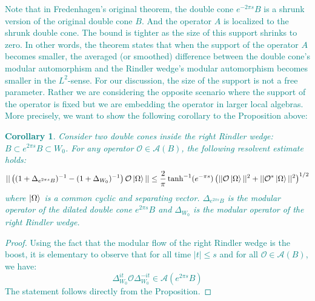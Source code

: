 \documentclass[a4paper,11pt]{article}
\newtheorem{corollary}[theorem]{Corollary}
\theoremstyle{definition}
\newcommand{\lb}{\left(}
\newcommand{\rb}{\right)}
\newcommand{\YC}[1]{\textcolor{teal}{#1}}
\begin{document}
\YC{
Note that in Fredenhagen's original theorem, the double cone $e^{-2\pi s}B$ is a shrunk version of the original double cone $B$. And the operator $A$ is localized to the shrunk double cone. The bound is tighter as the size of this support shrinks to zero. In other words, the theorem states that when the support of the operator $A$ becomes smaller, the averaged (or smoothed) difference between the double cone's modular automorphism and the Rindler wedge's modular automorphism becomes smaller in the $L^2$-sense. For our discussion, the size of the support is not a free parameter. Rather we are considering the opposite scenario where the support of the operator is fixed but we are embedding the operator in larger local algebras. More precisely, we want to show the following corollary to the Proposition above:
\begin{corollary}
    Consider two double cones inside the right Rindler wedge: $B\subset e^{2\pi s}B\subset W_0$. For any operator $\mathcal{O}\in\mathcal{A}(B)$, the following resolvent estimate holds:
    \begin{equation}
        ||\lb(1 + \Delta_{e^{2\pi s}B})^{-1} - (1 + \Delta_{W_0})^{-1}\rb\mathcal{O}\ket{\Omega}||\leq \frac{2}{\pi}\tanh^{-1}(e^{-\pi s})\lb||\mathcal{O}\ket{\Omega}||^2 + ||\mathcal{O}^*\ket{\Omega}||^2\rb^{1/2}
    \end{equation}
    where $\ket{\Omega}$ is a common cyclic and separating vector. $\Delta_{e^{2\pi s}B}$ is the modular operator of the dilated double cone $e^{2\pi s}B$ and $\Delta_{W_0}$ is the modular operator of the right Rindler wedge.
\end{corollary}
\begin{proof}
    Using the fact that the modular flow of the right Rindler wedge is the boost, it is elementary to observe that for all time $|t|\leq s$ and for all $\mathcal{O}\in\mathcal{A}(B)$, we have:
    \begin{equation}
        \Delta_{W_0}^{it}\mathcal{O}\Delta^{-it}_{W_0} \in \mathcal{A}(e^{2\pi s}B)
    \end{equation}
    The statement follows directly from the Proposition.
\end{proof}
}
\end{document}
